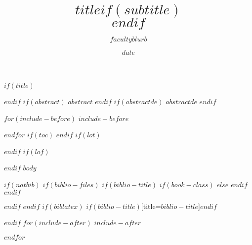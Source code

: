 \documentclass[$if(fontsize)$$fontsize$,$endif$$if(lang)$$lang$,$endif$$if(papersize)$$papersize$,$endif$$for(classoption)$$classoption$$sep$,$endfor$]{$documentclass$}
\title{$title$$if(subtitle)$\\\vspace{0.5em}{\large $subtitle$}$endif$}
\author{\parbox{\textwidth}{\normalsize\centering
  { $facultyblurb$ }}}
\date{$date$}
\begin{document}
$if(title)$
\maketitle
$endif$
$if(abstract)$
$abstract$
$endif$
$if(abstractde)$
$abstractde$
$endif$

$for(include-before)$
$include-before$

$endfor$
$if(toc)$
\cleardoubleoddpage
{
\hypersetup{linkcolor=black}
\setcounter{tocdepth}{$toc-depth$}
\tableofcontents
}
$endif$
$if(lot)$
\cleardoubleoddpage
\listoftables
$endif$
$if(lof)$
\cleardoubleoddpage
\listoffigures
$endif$
\cleardoubleoddpage
$body$

$if(natbib)$
$if(biblio-files)$
$if(biblio-title)$
$if(book-class)$
\renewcommand\bibname{$biblio-title$}
$else$
\renewcommand\refname{$biblio-title$}
$endif$
$endif$


$endif$
$endif$
$if(biblatex)$
\printbibliography$if(biblio-title)$[title=$biblio-title$]$endif$

$endif$
$for(include-after)$
$include-after$

$endfor$
\end{document}
